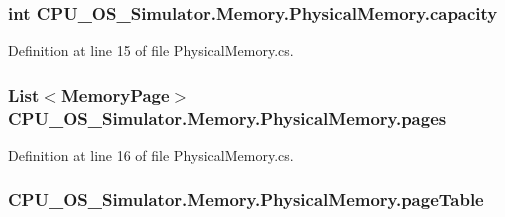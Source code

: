 \subsubsection[{capacity}]{\setlength{\rightskip}{0pt plus 5cm}int C\+P\+U\+\_\+\+O\+S\+\_\+\+Simulator.\+Memory.\+Physical\+Memory.\+capacity\hspace{0.3cm}{\ttfamily [private]}}\label{class_c_p_u___o_s___simulator_1_1_memory_1_1_physical_memory_aefbb5641a06c37aa17bb523d8c90dc60}


Definition at line 15 of file Physical\+Memory.\+cs.

\hypertarget{class_c_p_u___o_s___simulator_1_1_memory_1_1_physical_memory_aaf32bdc314ba84ea7e120fb28e3a3e67}{}
\subsubsection[{pages}]{\setlength{\rightskip}{0pt plus 5cm}List$<${\bf Memory\+Page}$>$ C\+P\+U\+\_\+\+O\+S\+\_\+\+Simulator.\+Memory.\+Physical\+Memory.\+pages\hspace{0.3cm}{\ttfamily [private]}}\label{class_c_p_u___o_s___simulator_1_1_memory_1_1_physical_memory_aaf32bdc314ba84ea7e120fb28e3a3e67}


Definition at line 16 of file Physical\+Memory.\+cs.

\hypertarget{class_c_p_u___o_s___simulator_1_1_memory_1_1_physical_memory_a7812a37c95af296758ed7814a95a3ea3}{}
\subsubsection[{page\+Table}]{ C\+P\+U\+\_\+\+O\+S\+\_\+\+Simulator.\+Memory.\+Physical\+Memory.\+page\+Table\hspace{0.3cm}{\ttfamily [private]}}\label{class_c_p_u___o_s___simulator_1_1_memory_1_1_physical_memory_a7812a37c95af296758ed7814a95a3ea3}


